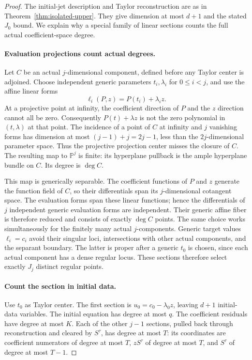 \begin{proof}
The initial-jet description and Taylor reconstruction are as in
Theorem~\ref{thm:isolated-upper}. They give dimension at most $d+1$
and the stated $J_0$ bound. We explain why a special family of linear
sections counts the full actual coefficient-space degree.

\paragraph{Evaluation projections count actual degrees.}
Let $C$ be an actual $j$-dimensional component, defined before any
Taylor center is adjoined. Choose independent generic parameters
$t_i,\lambda_i$ for $0\le i<j$, and use the affine linear forms
\[
 \ell_i(P,z)=P(t_i)+\lambda_i z.
\]
At a projective point at infinity, the coefficient direction of
$P$ and the $z$ direction cannot all be zero. Consequently
$P(t)+\lambda z$ is not the zero polynomial in $(t,\lambda)$ at
that point. The incidence of a point of $C$ at infinity and $j$
vanishing forms has dimension at most
$(j-1)+j=2j-1$, less than the $2j$-dimensional parameter space.
Thus the projective projection center misses the closure of $C$.
The resulting map to $\mathbb P^j$ is finite: its hyperplane
pullback is the ample hyperplane bundle on $C$. Its degree is
$\deg C$.

This map is generically separable. The coefficient functions of $P$
and $z$ generate the function field of $C$, so their differentials
span its $j$-dimensional cotangent space. The evaluation forms span
these linear functions; hence the differentials of $j$ independent
generic evaluation forms are independent. Their generic affine
fiber is therefore reduced and consists of exactly $\deg C$ points.
The same choice works simultaneously for the finitely many actual
$j$-components. Generic target values $\ell_i=c_i$ avoid their
singular loci, intersections with other actual components, and the
separant boundary. The latter is proper after a generic $t_0$ is
chosen, since each actual component has a dense regular locus.
These sections therefore select exactly $J_j$ distinct regular points.

\paragraph{Count the section in initial data.}
Use $t_0$ as Taylor center. The first section is
$u_0=c_0-\lambda_0z$, leaving $d+1$ initial-data variables. The
initial equation has degree at most $q$. The coefficient residuals
have degree at most $K$. Each of the other $j-1$ sections, pulled
back through reconstruction and cleared by $S^\tau$, has degree
at most $T$: its coordinates are coefficient numerators of degree
at most $T$, $zS^\tau$ of degree at most $T$, and $S^\tau$ of
degree at most $T-1$.


\end{proof}
